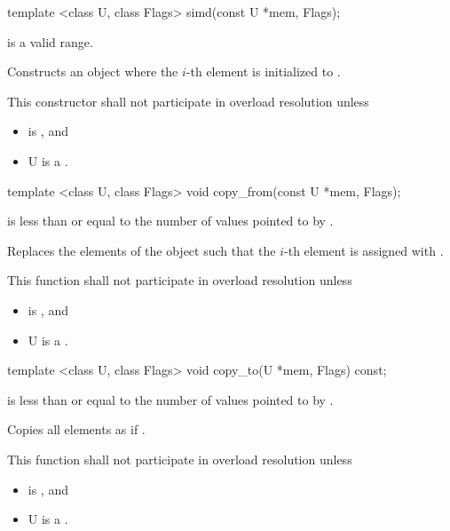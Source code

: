 \begin{itemdecl}
template <class U, class Flags> simd(const U *mem, Flags);
\end{itemdecl}
\begin{itemdescr}
  \code{[mem, mem + size())} is a valid range.

  \pnum\effects Constructs an object where the $i$-th element is initialized to  \foralli.

  \pnum\remarks This constructor shall not participate in overload resolution unless
  \begin{itemize}
      \item {} is \true, and
      \item \type U is a \realArithmeticType.
  \end{itemize}
\end{itemdescr}

\begin{itemdecl}
template <class U, class Flags> void copy_from(const U *mem, Flags);
\end{itemdecl}
\begin{itemdescr}
   is less than or equal to the number of values pointed to by .

  \pnum\effects Replaces the elements of the \simd object such that the $i$-th element is assigned with  \foralli.

  \pnum\remarks This function shall not participate in overload resolution unless
  \begin{itemize}
      \item {} is \true, and
      \item \type U is a \realArithmeticType.
  \end{itemize}
\end{itemdescr}

\begin{itemdecl}
template <class U, class Flags> void copy_to(U *mem, Flags) const;
\end{itemdecl}
\begin{itemdescr}
   is less than or equal to the number of values pointed to by .

  \pnum\effects Copies all \simd elements as if  \foralli.

  \pnum\remarks This function shall not participate in overload resolution unless
  \begin{itemize}
      \item {} is \true, and
      \item \type U is a \realArithmeticType.
  \end{itemize}
\end{itemdescr}

